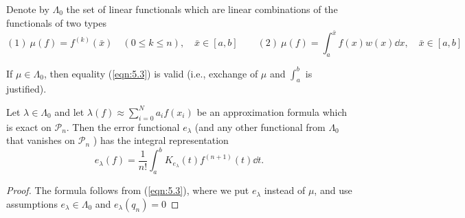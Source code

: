 \documentclass[a4paper]{article}
\begin{document}
\begin{definition}
    Denote by $\Lambda_0$ the set of linear functionals which are linear combinations of the functionals of two types
\[
    (1)\ \mu(f)=f^{(k)}(\bar{x}) \quad(0 \leq k \leq n), \quad \bar{x} \in[a, b]\qquad
    (2)\ \mu(f)=\int_a^{\bar{x}} f(x) w(x) \dd{x}, \quad \bar{x} \in[a, b]
\]
\end{definition}
\begin{lemma}
    If $\mu \in \Lambda_0$, then equality (\ref{eqn:5.3}) is valid (i.e., exchange of $\mu$ and $\int_a^b$ is justified).
\end{lemma}
\begin{theorem}
    Let $\lambda \in \Lambda_0$ and let $\lambda(f) \approx \sum_{i=0}^N a_i f\left(x_i\right)$ be an approximation formula which is exact on $\mathcal{P}_n$. Then the error functional $e_\lambda$ (and any other functional from $\Lambda_0$ that vanishes on $\mathcal{P}_n$ ) has the integral representation
\begin{equation}\label{eqn:5.4}
    e_\lambda(f)=\frac{1}{n !} \int_a^b K_{e_\lambda}(t) f^{(n+1)}(t) \dd{t} .
\end{equation}
\end{theorem}
\begin{proof}
    The formula follows from (\ref{eqn:5.3}), where we put $e_\lambda$ instead of $\mu$, and use assumptions $e_\lambda \in \Lambda_0$ and $e_\lambda\left(q_n\right)=0$
\end{proof}
\end{document}

